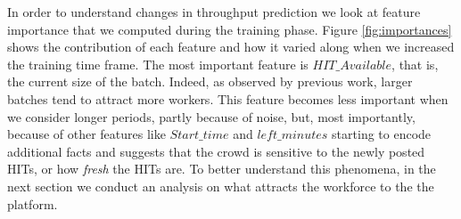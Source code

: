 In order to understand  changes in throughput prediction we  look at  feature importance that we computed during   the training phase. Figure \ref{fig:importances} shows the  contribution of each feature and how it varied along when we increased the training time frame.
The most important feature is $HIT\_Available$, that is, the current size of the batch. Indeed, as observed by previous work, larger batches tend to attract more workers\cite{mturk,crowddb}. This feature becomes less important when we consider longer periods, partly because of  noise, but, most importantly, because of other features like $Start\_time$ and $left\_minutes$ starting to encode additional facts and suggests that the crowd is sensitive to the newly posted HITs, or how \emph{fresh} the HITs are. To better understand this phenomena, in the next section we conduct an analysis on what attracts the workforce to the the platform.

